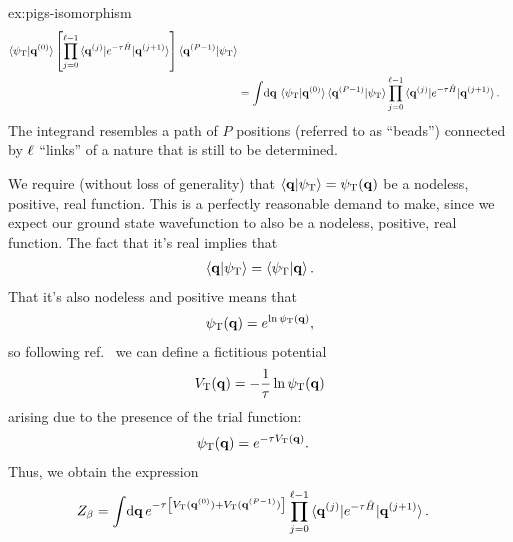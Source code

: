 \begin{DefAnswer}{ex:pigs-isomorphism}
\begin{subequations}
\begin{align}
			\braket{\psiT | \vec{q}\bead{0}}
			\left[ \prod_{j=0}^{\links - 1}
				\braket{\vec{q}\bead{j} | e^{-\tau \hat{H}} | \vec{q}\bead{j+1}}
			\right]
			\braket{\vec{q}\bead{P-1} | \psiT} \\
		&= \int\! \dif \vec{q} \,
			\braket{\psiT | \vec{q}\bead{0}}
			\braket{\vec{q}\bead{P-1} | \psiT}
			\prod_{j=0}^{\links - 1}
				\braket{\vec{q}\bead{j} | e^{-\tau \hat{H}} | \vec{q}\bead{j+1}}.
	\end{align}
	\end{subequations}
	The integrand resembles a path of $P$ positions (referred to as ``beads'') connected by $\ell$ ``links'' of a nature that is still to be determined.

	We require (without loss of generality) that $\braket{\bm{\mathbf{q}} | \psi_\mathrm{T}} = \psi_\mathrm{T}(\bm{\mathbf{q}})$ be a nodeless, positive, real function.
	This is a perfectly reasonable demand to make, since we expect our ground state wavefunction to also be a nodeless, positive, real function.
	The fact that it's real implies that
	\begin{align}
		\braket{\bm{\mathbf{q}} | \psi_\mathrm{T}} = \braket{\psi_\mathrm{T} | \bm{\mathbf{q}}}.
	\end{align}
	That it's also nodeless and positive means that
	\begin{align}
		\psi_\mathrm{T}(\bm{\mathbf{q}}) = e^{\ln{\psi_\mathrm{T}(\bm{\mathbf{q}})}},
	\end{align}
	so following ref.~\cite{schmidt2014inclusion} we can define a fictitious potential
	\begin{align}
		V_\mathrm{T}(\bm{\mathbf{q}}) = -\frac{1}{\tau} \ln{\psi_\mathrm{T}(\bm{\mathbf{q}})}
	\end{align}
	arising due to the presence of the trial function:
	\begin{align}
		\psi_\mathrm{T}(\bm{\mathbf{q}})
		&= e^{-\tau V_\mathrm{T}(\bm{\mathbf{q}})}.
	\end{align}
	Thus, we obtain the expression
	\begin{align}
		Z_\beta
		&= \int\! \dif \vec{q} \,
			e^{-\tau \left[ \VT(\vec{q}\bead{0}) + \VT(\vec{q}\bead{P-1}) \right]}
			\prod_{j=0}^{\links - 1}
				\braket{\vec{q}\bead{j} | e^{-\tau \hat{H}} | \vec{q}\bead{j+1}}.
	\end{align}


\end{DefAnswer}
